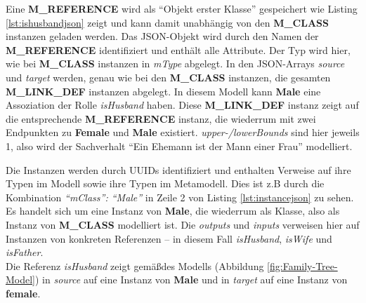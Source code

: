 

Eine \textbf{M\_REFERENCE} wird als "`Objekt erster Klasse"' gespeichert wie Listing \ref{lst:ishusbandjson} zeigt und kann damit unabhängig von den \textbf{M\_CLASS} instanzen geladen werden. Das JSON-Objekt wird durch den Namen der \textbf{M\_REFERENCE} identifiziert und enth\"alt alle Attribute. Der Typ wird hier, wie bei \textbf{M\_CLASS} instanzen in \textit{mType} abgelegt. In den JSON-Arrays \textit{source} und \textit{target} werden, genau wie bei den \textbf{M\_CLASS} instanzen, die gesamten \textbf{M\_LINK\_DEF} instanzen abgelegt. In diesem Modell kann \textbf{Male} eine Assoziation der Rolle \textit{isHusband} haben. Diese \textbf{M\_LINK\_DEF} instanz zeigt auf die entsprechende \textbf{M\_REFERENCE} instanz, die wiederrum mit zwei Endpunkten zu \textbf{Female} und \textbf{Male} existiert. \textit{upper-/lowerBounds} sind hier jeweils 1, also wird der Sachverhalt "`Ein Ehemann ist der Mann einer Frau"' modelliert.



Die Instanzen werden durch UUIDs identifiziert und enthalten Verweise auf ihre Typen im Modell sowie ihre Typen im Metamodell. Dies ist z.B durch die Kombination \textit{"`mClass"': "`Male"'} in Zeile 2 von Listing \ref{lst:instancejson} zu sehen. Es handelt sich um eine Instanz von \textbf{Male}, die wiederrum als Klasse, also als Instanz von \textbf{M\_CLASS} modelliert ist. Die \textit{outputs} und \textit{inputs} verweisen hier auf Instanzen von konkreten Referenzen -- in diesem Fall \textit{isHusband}, \textit{isWife} und \textit{isFather}.\\
Die Referenz \textit{isHusband} zeigt gem\"a\ss des Modells (Abbildung \ref{fig:Family-Tree-Model}) in \textit{source} auf eine Instanz von \textbf{Male} und in \textit{target} auf eine Instanz von \textbf{female}.











